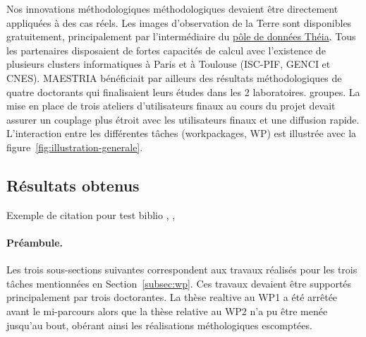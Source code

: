 Nos innovations méthodologiques méthodologiques devaient être directement appliquées à des cas réels. Les images d'observation de la Terre sont disponibles gratuitement, principalement par l'intermédiaire du \href{https://www.theia-land.fr/pole-theia-2/}{pôle de données Théia}. Tous les partenaires disposaient de fortes capacités
de calcul avec l'existence de plusieurs clusters informatiques à Paris et à Toulouse (ISC-PIF, GENCI et CNES). MAESTRIA bénéficiait par ailleurs des résultats méthodologiques de quatre doctorants qui finalisaient leurs études dans les 2 laboratoires. groupes. La mise en place de trois ateliers d'utilisateurs finaux au cours du projet devait assurer un couplage plus étroit avec les utilisateurs finaux et une diffusion rapide.\\

L'interaction entre les différentes tâches (workpackages, WP) est illustrée avec la figure~\ref{fig:illustration-generale}.


\subsection{Résultats obtenus}

Exemple de citation pour test biblio \citep{Luc_RS}, \citep{Luc_IGARSS22}, \citep{Luc_IGARSS21} \citep{isprs-archives-XLIII-B2-2020-703-2020} \citep{Stocker_ISPRS20} \citep{Hermann_ISPRS22} \citep{Nico_RSL} \citep{GIRYFOUQUET2021320}

\paragraph{Préambule.}
Les trois sous-sections suivantes correspondent aux travaux réalisés pour les trois tâches mentionnées en Section~\ref{subsec:wp}. Ces travaux devaient être supportés principalement par trois doctorant\textperiodcentered e\textperiodcentered s. La thèse realtive au WP1 a été arrêtée avant le mi-parcours alors que la thèse relative au WP2 n'a pu être menée jusqu'au bout, obérant ainsi les réalisations méthologiques escomptées.


